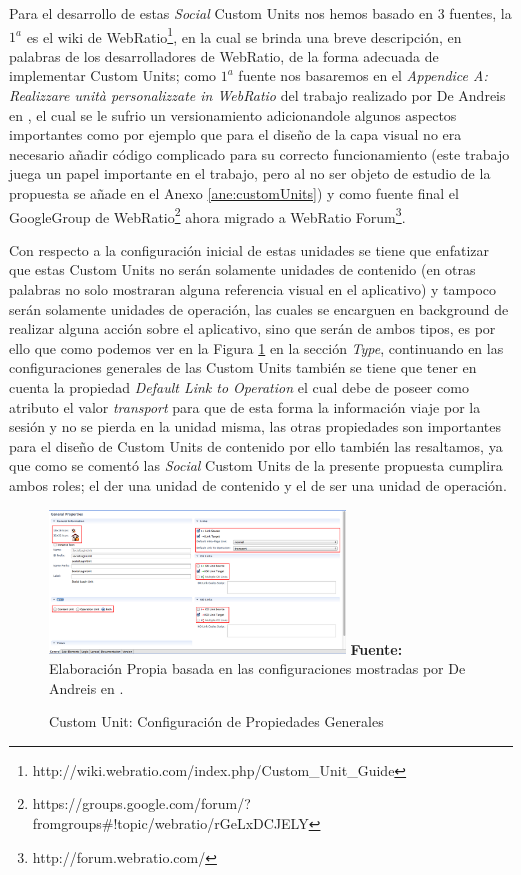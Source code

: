 \documentclass[oneside,12pt,a4paper]{memoir}%
\begin{document}
	Para el desarrollo de estas \textit{Social} Custom Units nos hemos basado en 3
	fuentes, la $1^a$ es el wiki de
	WebRatio\footnote{http://wiki.webratio.com/index.php/Custom\_Unit\_Guide}, en
	la cual se brinda una breve descripci\'on, en palabras de los desarrolladores de
	WebRatio, de la forma adecuada de implementar Custom Units; como $1^a$ fuente
	nos basaremos en el \textit{Appendice A: Realizzare unit\`a personalizzate in
	WebRatio} del trabajo realizado por De Andreis en \cite{Andreis2010}, el cual
	se le sufrio un versionamiento adicionandole algunos aspectos importantes como
	por ejemplo que para el dise\~no de la capa visual no era necesario a\~nadir
	c\'odigo complicado para su correcto funcionamiento (este trabajo juega un
	papel importante en el trabajo, pero al no ser objeto de estudio de la
	propuesta se a\~nade en el Anexo \ref{ane:customUnits}) y como fuente final el
	GoogleGroup de
	WebRatio\footnote{https://groups.google.com/forum/?fromgroups\#!topic/webratio/rGeLxDCJELY}
	ahora migrado a WebRatio Forum\footnote{http://forum.webratio.com/}.
	
	Con respecto a la configuraci\'on inicial de estas unidades se tiene que
	enfatizar que estas Custom Units no ser\'an solamente unidades de contenido
	(en otras palabras no solo mostraran alguna referencia visual en el aplicativo)
	y tampoco ser\'an solamente unidades de operaci\'on, las cuales se encarguen en
	background de realizar alguna acci\'on sobre el aplicativo, sino que ser\'an de
	ambos tipos, es por ello que como podemos ver en la Figura
	\ref{fig:configCustomUnit} en la secci\'on \textit{Type}, continuando en las configuraciones generales de
	las Custom Units tambi\'en se tiene que tener en cuenta la propiedad
	\textit{Default Link to Operation} el cual debe de poseer como atributo el
	valor \textit{transport} para que de esta forma la informaci\'on viaje por la
	sesi\'on y no se pierda en la unidad misma, las otras propiedades son
	importantes para el dise\~no de Custom Units de contenido por ello tambi\'en
	las resaltamos, ya que como se coment\'o las \textit{Social} Custom Units de la
	presente propuesta cumplira ambos roles; el der una unidad de contenido y el de
	ser una unidad de operaci\'on.
	
	\begin{figure}[here]
		\centering 
		\caption{Custom Unit: Configuraci\'on de Propiedades Generales}
		\includegraphics[angle=90,width=0.7\textwidth]{figure/dev/fig_SocialLoginUnit_dev.png}
		\newline
		\textbf{Fuente:} Elaboraci\'on Propia basada en las configuraciones
		mostradas por De Andreis en \cite{Andreis2010}.
		\label{fig:configCustomUnit}
	\end{figure}
	
\end{document}
